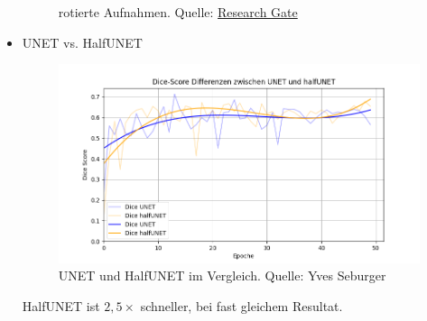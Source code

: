 \documentclass{beamer}
\begin{document}
\begin{frame}[allowframebreaks]
\begin{itemize}
\begin{figure}
        \caption{rotierte Aufnahmen. Quelle: \href{https://www.researchgate.net/publication/361186968/figure/fig3/AS:11431281182545975@1692382952577/The-architecture-of-Half-UNet-The-input-image-size-is-detailed-in-Table-2-The-numbers.tif}{Research Gate}}
    \end{figure}
    \item UNET vs. HalfUNET
    \begin{figure}
        \includegraphics[width=0.85\linewidth]{Bilder/UNET_vs_halfUNET.png}
        \caption{UNET und HalfUNET im Vergleich. \scriptsize{Quelle: Yves Seburger}}
    \end{figure}
    HalfUNET ist \raisebox{0.5ex}{\texttildelow}$2,5 \times$ schneller, bei fast gleichem Resultat.
    \end{itemize}
\end{frame}
\end{document}
